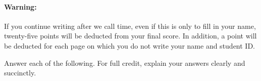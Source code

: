 \documentclass[addpoints,12pt]{exam}
\begin{document}
\paragraph{Warning:} If you continue writing after we call time, even if this is only to fill in your name, twenty-five points will be deducted from your final score. In addition, a point will be deducted for each page on which you do not write your name and student ID.

\newpage
\begin{questions}

\question Answer each of the following. For full credit, explain your answers clearly and succinctly.
\begin{parts}
%


\end{parts}
\end{questions}
\end{document}
